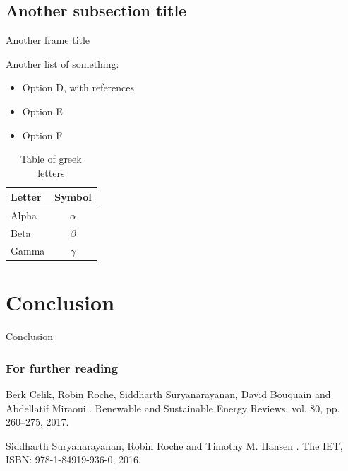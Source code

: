 \documentclass[9pt,handout]{beamer} %
\begin{document}

\subsection{Another subsection title}


\begin{frame}{Another frame title}

Another list of something:
\begin{itemize}
\item Option D, with references \cite{celik-rser,iet-book}
\item Option E
\item Option F
\end{itemize}

\vspace*{1em}
\begin{table}
\centering
\caption{Table of greek letters}
\begin{tabular}{|l|c|}
\hline 
\textbf{Letter} & \textbf{Symbol}\\
\hline 
Alpha & $\alpha$ \\ 
Beta & $\beta$ \\ 
Gamma & $\gamma$ \\ 
\hline 
\end{tabular} 
\end{table}

\end{frame}



\section{Conclusion}


\begin{frame}{Conclusion}

\lipsum[1-1]

\end{frame}


\begin{frame}[allowframebreaks]
\frametitle{For further reading}

\footnotesize

\begin{thebibliography}{bib}

Berk Celik, Robin Roche, Siddharth Suryanarayanan, David Bouquain and Abdellatif Miraoui
.
\newblock Renewable and Sustainable Energy Reviews, vol. 80, pp. 260--275, 2017.

Siddharth Suryanarayanan, Robin Roche and Timothy M. Hansen
.
\newblock The IET, ISBN: 978-1-84919-936-0, 2016.

\end{thebibliography}
\end{frame}
\end{document}
